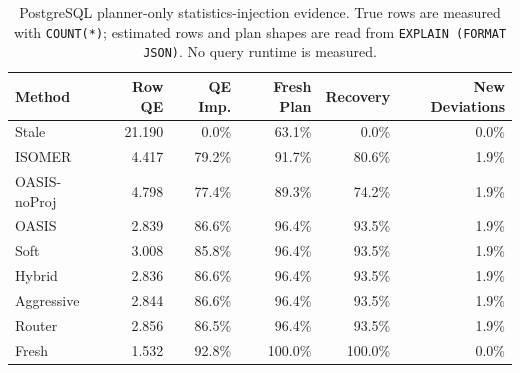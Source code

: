 \begin{table}[t]
  \centering
  \small
  \caption{PostgreSQL planner-only statistics-injection evidence. True rows are measured with \texttt{COUNT(*)}; estimated rows and plan shapes are read from \texttt{EXPLAIN (FORMAT JSON)}. No query runtime is measured.}
  \label{tab:postgres_planner_stats_injection}
  \setlength{\tabcolsep}{4pt}
  \begin{tabular}{lrrrrr}
    \toprule
    Method & Row QE & QE Imp. & Fresh Plan & Recovery & New Deviations \\
    \midrule
    Stale & 21.190 & 0.0\% & 63.1\% & 0.0\% & 0.0\% \\
    ISOMER & 4.417 & 79.2\% & 91.7\% & 80.6\% & 1.9\% \\
    OASIS-noProj & 4.798 & 77.4\% & 89.3\% & 74.2\% & 1.9\% \\
    OASIS & 2.839 & 86.6\% & 96.4\% & 93.5\% & 1.9\% \\
    Soft & 3.008 & 85.8\% & 96.4\% & 93.5\% & 1.9\% \\
    Hybrid & 2.836 & 86.6\% & 96.4\% & 93.5\% & 1.9\% \\
    Aggressive & 2.844 & 86.6\% & 96.4\% & 93.5\% & 1.9\% \\
    Router & 2.856 & 86.5\% & 96.4\% & 93.5\% & 1.9\% \\
    Fresh & 1.532 & 92.8\% & 100.0\% & 100.0\% & 0.0\% \\
    \bottomrule
  \end{tabular}
\end{table}

